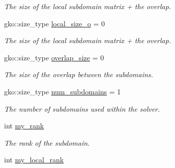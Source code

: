 \begin{DoxyCompactItemize}
\begin{DoxyCompactList}\small\item\em The size of the local subdomain matrix + the overlap. \end{DoxyCompactList}\item 
\mbox{\label{structschwz_1_1Metadata_ad5cf4b6c627cb4f5be927f2c968c7e0d}} 
gko\+::size\+\_\+type \hyperlink{structschwz_1_1Metadata_ad5cf4b6c627cb4f5be927f2c968c7e0d}{local\+\_\+size\+\_\+o} = 0
\begin{DoxyCompactList}\small\item\em The size of the local subdomain matrix + the overlap. \end{DoxyCompactList}\item 
\mbox{\label{structschwz_1_1Metadata_ad1d2e8aadc49157a91b0deabda53621e}} 
gko\+::size\+\_\+type \hyperlink{structschwz_1_1Metadata_ad1d2e8aadc49157a91b0deabda53621e}{overlap\+\_\+size} = 0
\begin{DoxyCompactList}\small\item\em The size of the overlap between the subdomains. \end{DoxyCompactList}\item 
\mbox{\label{structschwz_1_1Metadata_aaba09003a5ffa4e8770d5f9f76d69d6b}} 
gko\+::size\+\_\+type \hyperlink{structschwz_1_1Metadata_aaba09003a5ffa4e8770d5f9f76d69d6b}{num\+\_\+subdomains} = 1
\begin{DoxyCompactList}\small\item\em The number of subdomains used within the solver. \end{DoxyCompactList}\item 
\mbox{\label{structschwz_1_1Metadata_ac8ebd3ef6215f782ad5179b46994533f}} 
int \hyperlink{structschwz_1_1Metadata_ac8ebd3ef6215f782ad5179b46994533f}{my\+\_\+rank}
\begin{DoxyCompactList}\small\item\em The rank of the subdomain. \end{DoxyCompactList}\item 
\mbox{\label{structschwz_1_1Metadata_a8e48fee48d4865f2a23782e2bf3e9f5c}} 
int \hyperlink{structschwz_1_1Metadata_a8e48fee48d4865f2a23782e2bf3e9f5c}{my\+\_\+local\+\_\+rank}

\end{DoxyCompactItemize}
